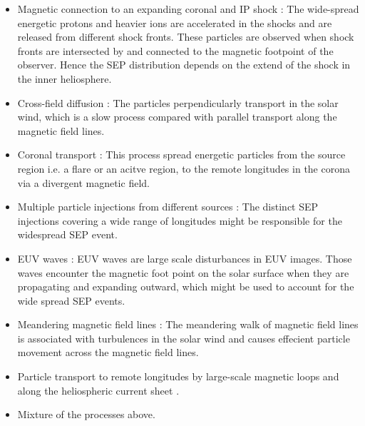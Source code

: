 \begin{itemize}
	\item Magnetic connection to an expanding coronal and IP shock \citep{Cliver1995ICRC, Torsti1999JGR, Reames1999, cane2003two, Richardson2014SoPh, Kouloumvakos2019ApJ}: 
	The wide-spread energetic protons and heavier ions are accelerated in the shocks and are released from different shock fronts. These particles are observed when shock fronts are intersected by and connected to the magnetic footpoint of the observer. Hence the \ac{SEP} distribution depends on the extend of the shock in the inner heliosphere.

	\item Cross-field diffusion \citep{Dresing2012SoPh}: The particles perpendicularly transport in the solar wind, which is a slow process compared with parallel transport along the magnetic field lines.
	
	\item Coronal transport \citep{Reinhard1974SoPh, Newkirk1978JGR}: This process spread energetic particles from the source region i.e. a flare or an acitve region, to the remote longitudes in the corona via a divergent magnetic field. 

	\item Multiple particle injections from different sources \citep{dresing202317}: The distinct \ac{SEP} injections covering a wide range of longitudes might be responsible for the widespread \ac{SEP} event.

	\item \ac{EUV} waves \citep{Rouillard2012ApJ, Park2013ApJ}: \ac{EUV} waves are large scale disturbances in \ac{EUV} images. Those waves encounter the magnetic foot point on the solar surface when they are propagating and expanding outward, which might be used to account for the wide spread \ac{SEP} events.
	
	\item Meandering magnetic field lines \citep{Laitinen2016AA, Laitinen2023ApJL}: The meandering walk of magnetic field lines is associated with turbulences in the solar wind and causes effecient particle movement across the magnetic field lines.
	\item Particle transport to remote longitudes by large-scale magnetic loops \citep{Klassen2018AA, Schrijver2013ApJ} and along the heliospheric current sheet \citep{Battarbee2018ApJ}.
	\item Mixture of the processes above.
\end{itemize}

